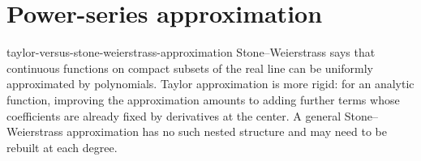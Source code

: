 \documentclass[preview]{standalone}
\begin{document}
\section{Power-series approximation}

\begin{snippet}{taylor-versus-stone-weierstrass-approximation}
    Stone--Weierstrass says that continuous functions on compact subsets of
    the real line can be uniformly approximated by polynomials. Taylor
    approximation is more rigid: for an analytic function, improving the
    approximation amounts to adding further terms whose coefficients are
    already fixed by derivatives at the center. A general
    Stone--Weierstrass approximation has no such nested structure and may need
    to be rebuilt at each degree.
\end{snippet}
\end{document}
